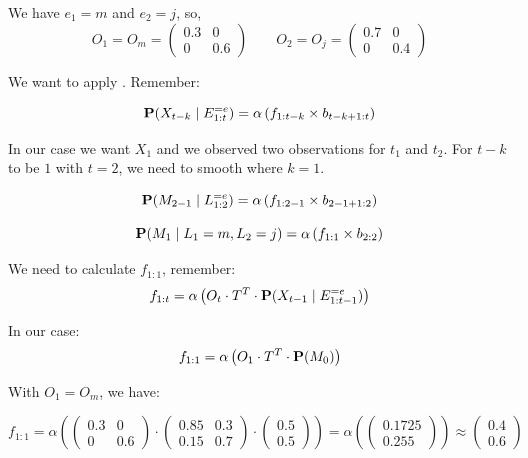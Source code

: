 We have $e_1 = m$ and $e_2 = j$, so, 
\[
O_1 = O_m = 
\begin{pmatrix}
0.3 & 0 \\
0 & 0.6
\end{pmatrix} \qquad 
O_2 = O_j = 
\begin{pmatrix}
0.7 & 0 \\
0 & 0.4
\end{pmatrix}
\]


We want to apply . Remember:

\[
\textbf{P}(X_{t-k} \mid E_{1:t}^{=e}) = \alpha \left( f_{1:t-k} \times b_{t-k+1:t} \right)
\]

In our case we want $X_1$ and we observed two observations for $t_1$ and $t_2$. For $t-k$ to be $1$ with $t=2$, we need to smooth where $k=1$.

\[
\textbf{P}(M_{2-1} \mid L_{1:2}^{=e}) = \alpha \left( f_{1:2-1} \times b_{2-1+1:2} \right)
\]

\[
\textbf{P}(M_{1} \mid L_1 = m, L_2 = j) = \alpha \left( f_{1:1} \times b_{2:2} \right)
\]

We need to calculate $f_{1:1}$, remember:
\[
f_{1:t} = 
\alpha \left(
O_t \cdot T^T \cdot \textbf{P}(X_{t-1} \mid E_{1:t-1}^{=e})
\right)
\]

In our case:
\[
f_{1:1} = 
\alpha \left(
O_1 \cdot T^T \cdot \textbf{P}(M_0)
\right)
\]

With $O_1 = O_m$, we have:

\[
f_{1:1} = 
\alpha \left(
\begin{pmatrix}
0.3 & 0 \\
0 & 0.6
\end{pmatrix} \cdot 
\begin{pmatrix}
0.85 & 0.3 \\
0.15 & 0.7
\end{pmatrix} \cdot 
\begin{pmatrix}
0.5\\ 
0.5
\end{pmatrix}
\right) =
\alpha \left(
\begin{pmatrix}
0.1725 \\ 
0.255
\end{pmatrix}
\right) \approx
\begin{pmatrix}
0.4 \\ 
0.6
\end{pmatrix}
\]

